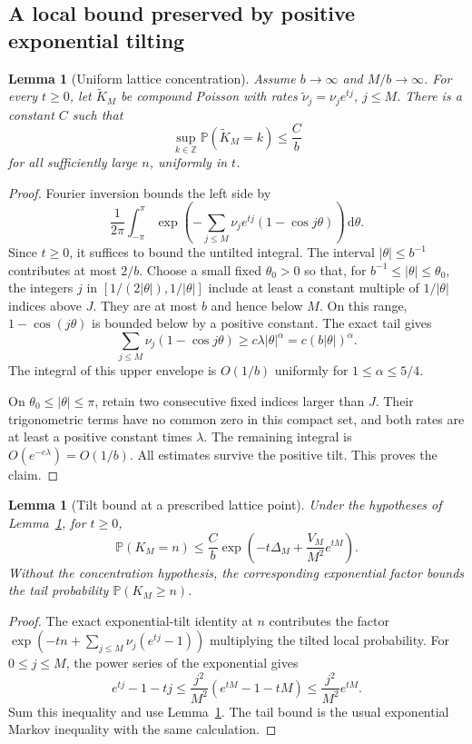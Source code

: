 \documentclass[11pt,a4paper]{article}
\numberwithin{equation}{section}
\newtheorem{lemma}[theorem]{Lemma}
\theoremstyle{definition}
\theoremstyle{remark}
\newcommand{\Prob}{\mathbb P}
\newcommand{\dd}{\,\mathrm d}
\begin{document}
\subsection{A local bound preserved by positive exponential tilting}
\begin{lemma}[Uniform lattice concentration]\label{lem:concentration}
Assume $b\to\infty$ and $M/b\to\infty$. For every $t\ge0$, let
$\widetilde K_M$ be compound Poisson with rates
$\widetilde\nu_j=\nu_je^{tj}$, $j\le M$. There is a constant $C$ such that
\begin{equation}\label{eq:lattice}
 \sup_{k\in\mathbb Z}\Prob(\widetilde K_M=k)\le\frac Cb
\end{equation}
for all sufficiently large $n$, uniformly in $t$.
\end{lemma}
\begin{proof}
Fourier inversion bounds the left side by
\[
 \frac1{2\pi}\int_{-\pi}^{\pi}
 \exp\left(-\sum_{j\le M}\nu_je^{tj}(1-\cos j\theta)\right)\dd\theta.
\]
Since $t\ge0$, it suffices to bound the untilted integral. The interval
$|\theta|\le b^{-1}$ contributes at most $2/b$. Choose a small fixed
$\theta_0>0$ so that, for $b^{-1}\le|\theta|\le\theta_0$, the integers
$j$ in $[1/(2|\theta|),1/|\theta|]$ include at least a constant multiple
of $1/|\theta|$ indices above $J$. They are at most $b$ and hence below
$M$. On this range, $1-\cos(j\theta)$ is bounded below by a positive
constant. The exact tail gives
\[
 \sum_{j\le M}\nu_j(1-\cos j\theta)
 \ge c\lambda|\theta|^\alpha=c(b|\theta|)^\alpha.
\]
The integral of this upper envelope is $O(1/b)$ uniformly for
$1\le\alpha\le5/4$.

On $\theta_0\le|\theta|\le\pi$, retain two consecutive fixed indices
larger than $J$. Their trigonometric terms have no common zero in this
compact set, and both rates are at least a positive constant times
$\lambda$. The remaining integral is $O(e^{-c\lambda})=O(1/b)$.
All estimates survive the positive tilt. This proves the claim.
\end{proof}

\begin{lemma}[Tilt bound at a prescribed lattice point]\label{lem:tilt}
Under the hypotheses of Lemma~\ref{lem:concentration}, for $t\ge0$,
\begin{equation}\label{eq:tiltbound}
 \Prob(K_M=n)\le\frac Cb
 \exp\left(-t\Delta_M+\frac{V_M}{M^2}e^{tM}\right).
\end{equation}
Without the concentration hypothesis, the corresponding exponential
factor bounds the tail probability $\Prob(K_M\ge n)$.
\end{lemma}
\begin{proof}
The exact exponential-tilt identity at $n$ contributes the factor
$\exp(-tn+\sum_{j\le M}\nu_j(e^{tj}-1))$ multiplying the tilted local
probability. For $0\le j\le M$, the power series of the exponential gives
\[
 e^{tj}-1-tj\le\frac{j^2}{M^2}(e^{tM}-1-tM)
               \le\frac{j^2}{M^2}e^{tM}.
\]
Sum this inequality and use Lemma~\ref{lem:concentration}. The tail bound
is the usual exponential Markov inequality with the same calculation.
\end{proof}
\end{document}
